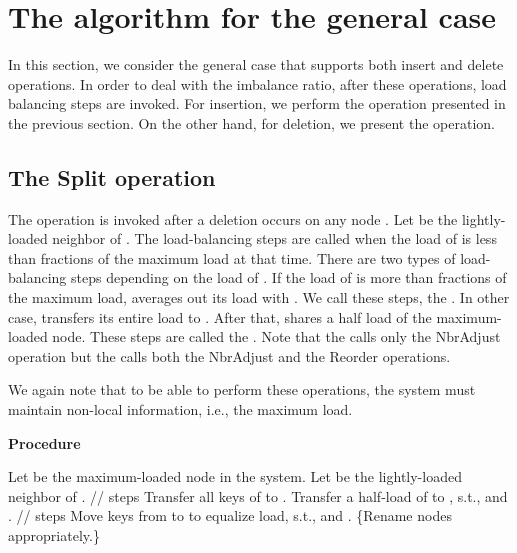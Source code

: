 \documentclass[a4paper]{article}
\begin{document}
\section{The algorithm for the general case}
\label{sect:algorithm-delete}

In this section, we consider the general case that supports both insert and delete
operations. In order to deal with the imbalance ratio, after these operations,
load balancing steps are invoked. For insertion, we perform the
{\minbalance} operation presented in the previous section. On the other
hand, for deletion, we present the {\split} operation.

\subsection{The Split operation}

The {\split} operation is invoked after a deletion occurs on any node
. Let  be the lightly-loaded neighbor of . 
The load-balancing steps are called when the load of  is less
than  fractions of the maximum load at that time. There are
two types of load-balancing steps depending on the load of .  If
the load of  is more than  fractions of the maximum load,
 averages out its load with . We call these steps, the
{\splitnbr}. In other case,  transfers its entire load to .
After that,  shares a half load of the maximum-loaded node.  These
steps are called the {\splitmax}. Note that the {\splitnbr} calls
only the {\sc NbrAdjust} operation but the {\splitmax} calls both the
{\sc NbrAdjust} and the {\sc Reorder} operations.

We again note that to be able to perform these operations, the system
must maintain non-local information, i.e., the maximum load.

\begin{algorithm} {\bf Procedure} {\split} 
  \label{alg:split}
  \begin{algorithmic}[1]
    \STATE Let  be the maximum-loaded node in the system. 
    \IF {} 
    \STATE Let  be the lightly-loaded neighbor of . 
    \IF {} 
    \STATE //{\splitmax} steps 
    \STATE Transfer all keys of  to .
    \STATE Transfer a half-load of  to , s.t.,  and . 
    \ELSE 
    \STATE //{\splitnbr} steps 
    \STATE
    Move keys from  to  to equalize load, s.t.,  and .
    \ENDIF
    \STATE \{Rename nodes appropriately.\}
    \ENDIF
  \end{algorithmic}
\end{algorithm}
\end{document}
